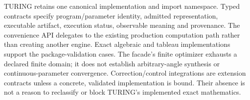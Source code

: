 TURING retains one canonical implementation and import namespace. Typed contracts
specify program/parameter identity, admitted representation, executable artifact,
execution status, observable meaning and provenance. The convenience API delegates
to the existing production computation path rather than creating another engine.
Exact algebraic and tableau implementations support the package-validation cases.
The facade's finite optimizer exhausts a declared finite domain; it does not
establish arbitrary-angle synthesis or continuous-parameter convergence.
Correction/control integrations are extension contracts unless a concrete,
validated implementation is bound. Their absence is not a reason to reclassify
or block TURING's implemented exact mathematics.
